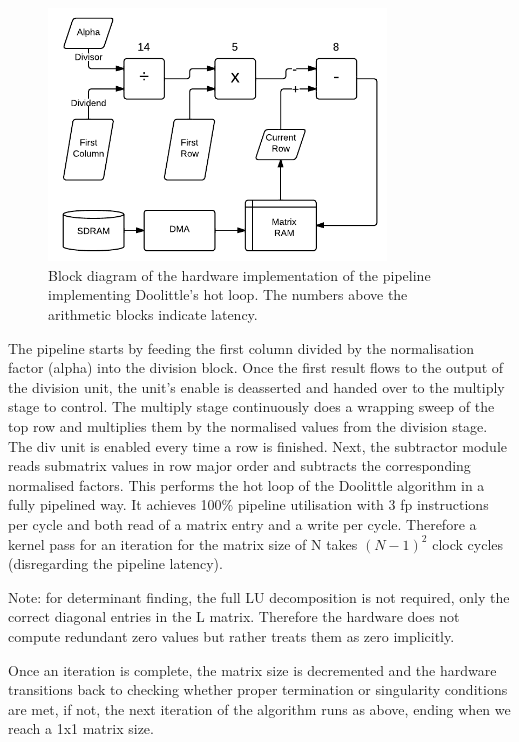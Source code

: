 \documentclass[]{article}
\begin{document}
\begin{figure}[htbp]
	\begin{center}
		\includegraphics[width = 0.8\textwidth]{DeterminantPipeline.pdf}
	\end{center}
	\caption{Block diagram of the hardware implementation of the pipeline implementing Doolittle's hot loop. The numbers above the arithmetic blocks indicate latency.}
	\label{fig:det_block}
\end{figure}

The pipeline starts by feeding the first column divided by the normalisation factor (alpha) into the division block. Once the first result flows to the output of the division unit, the unit’s enable is deasserted and handed over to the multiply stage to control. The multiply stage continuously does a wrapping sweep of the top row and multiplies them by the normalised values from the division stage. The div unit is enabled every time a row is finished. Next, the subtractor module reads submatrix values in row major order and subtracts the corresponding normalised factors. This performs the hot loop of the Doolittle algorithm in a fully pipelined way. It achieves 100\% pipeline utilisation with 3 fp instructions per cycle and both read of a matrix entry and a write per cycle. Therefore a kernel pass for an iteration for the matrix size of N takes $(N-1)^2$ clock cycles (disregarding the pipeline latency).

Note: for determinant finding, the full LU decomposition is not required, only the correct diagonal entries in the L matrix. Therefore the hardware does not compute redundant zero values but rather treats them as zero implicitly.

Once an iteration is complete, the matrix size is decremented and the hardware transitions back to checking whether proper termination or singularity conditions are met, if not, the next iteration of the algorithm runs as above, ending when we reach a 1x1 matrix size.
\end{document}
